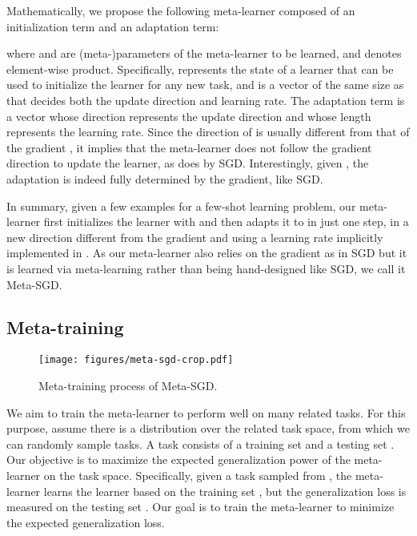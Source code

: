 \documentclass{article}
\begin{document}
Mathematically, we propose the following meta-learner composed of an initialization term and an adaptation term:

where  and  are (meta-)parameters of the meta-learner to be learned, and  denotes element-wise product. Specifically,  represents the state of a learner that can be used to initialize the learner for any new task, and  is a vector of the same size as  that decides both the update direction and learning rate. The adaptation term  is a vector whose direction represents the update direction and whose length represents the learning rate. Since the direction of  is usually different from that of the gradient , it implies that the meta-learner does not follow the gradient direction to update the learner, as does by SGD. Interestingly, given , the adaptation is indeed fully determined by the gradient, like SGD.


In summary, given a few examples  for a few-shot learning problem, our meta-learner first initializes the learner with  and then adapts it to  in just one step, in a new direction  different from the gradient  and using a learning rate implicitly implemented in . As our meta-learner also relies on the gradient as in SGD but it is learned via meta-learning rather than being hand-designed like SGD, we call it Meta-SGD.





\subsection{Meta-training}


\begin{figure}[t]
	\centering
	\texttt{[image: figures/meta-sgd-crop.pdf]}\vspace{0.0cm}
	\caption{Meta-training process of Meta-SGD.
}
	\label{fig:meta-update}\vspace{-10pt}
\end{figure}


We aim to train the meta-learner to perform well on many related tasks. For this purpose, assume there is a distribution  over the related task space, from which we can randomly sample tasks. A task  consists of a training set  and a testing set .
Our objective is to maximize the expected generalization power of the meta-learner on the task space. Specifically, given a task  sampled from , the meta-learner learns the learner based on the training set , but the generalization loss is measured on the testing set . Our goal is to train the meta-learner to minimize the expected generalization loss.
\end{document}

